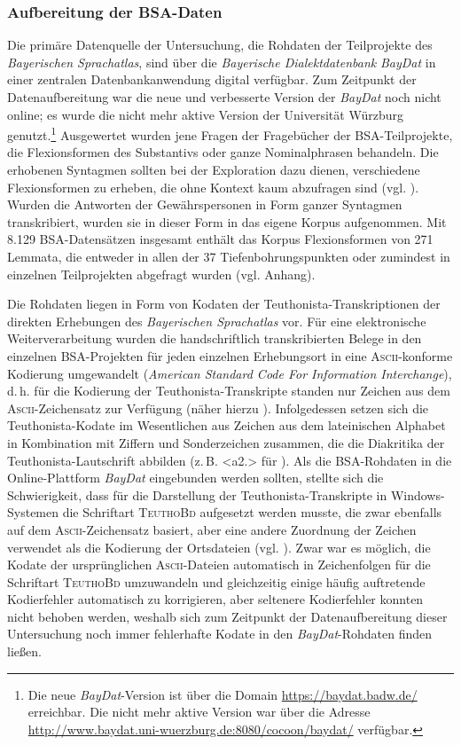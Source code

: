 \subsubsection{Aufbereitung der BSA-Daten}
\label{sec:6.3.1.1}
Die primäre Datenquelle der Untersuchung, die Rohdaten der Teilprojekte des \textit{Bayerischen Sprachatlas}, sind über die \textit{Bayerische Dialektdatenbank} \textit{BayDat} in einer zentralen Datenbankanwendung digital verfügbar. Zum Zeitpunkt der Datenaufbereitung war die neue und verbesserte Version der \textit{BayDat} noch nicht online; es wurde die nicht mehr aktive Version der Universität Würzburg genutzt.\footnote{Die neue \textit{BayDat}{}-Version ist über die Domain \url{https://baydat.badw.de/} erreichbar. Die nicht mehr aktive Version war über die Adresse \url{http://www.baydat.uni-wuerzburg.de:8080/cocoon/baydat/} verfügbar.} Ausgewertet wurden jene Fragen der Fragebücher der BSA-Teilprojekte, die Flexionsformen des Substantivs oder ganze Nominalphrasen behandeln. Die erhobenen Syntagmen sollten bei der Exploration dazu dienen, verschiedene Flexionsformen zu erheben, die ohne Kontext kaum abzufragen sind (vgl. \citealt[23]{Klepsch2013}). Wurden die Antworten der Gewährspersonen in Form ganzer Syntagmen transkribiert, wurden sie in dieser Form in das eigene Korpus aufgenommen. Mit 8.129 BSA-Datensätzen insgesamt enthält das Korpus Flexionsformen von 271 Lemmata, die entweder in allen der 37 Tiefenbohrungspunkten oder zumindest in einzelnen Teilprojekten abgefragt wurden (vgl. Anhang).

Die Rohdaten liegen in Form von Kodaten der Teuthonista-Transkriptionen der direkten Erhebungen des \textit{Bayerischen Sprachatlas} vor. Für eine elektronische Weiterverarbeitung wurden die handschriftlich transkribierten Belege in den einzelnen BSA-Projekten für jeden einzelnen Erhebungsort in eine \textsc{Ascii}{}-konforme Kodierung umgewandelt (\textit{American Standard Code For Information Interchange}), d.\,h. für die Kodierung der Teuthonista-Transkripte standen nur Zeichen aus dem \textsc{Ascii}{}-Zeichensatz zur Verfügung (näher hierzu \citealt[7--16]{Zimmermann2006}). Infolgedessen setzen sich die Teuthonista-Kodate im Wesentlichen aus Zeichen aus dem lateinischen Alphabet in Kombination mit Ziffern und Sonderzeichen zusammen, die die Diakritika der Teuthonista-Lautschrift abbilden (z.\,B. <a2.> für ). Als die BSA-Rohdaten in die Online-Plattform \textit{BayDat} eingebunden werden sollten, stellte sich die Schwierigkeit, dass für die Darstellung der Teuthonista-Transkripte in Windows-Systemen die Schriftart \textsc{TeuthoBd} aufgesetzt werden musste, die zwar ebenfalls auf dem \textsc{Ascii}{}-Zeichensatz basiert, aber eine andere Zuordnung der Zeichen verwendet als die Kodierung der Ortsdateien (vgl. \citealt[121]{Zimmermann2006}). Zwar war es möglich, die Kodate der ursprünglichen \textsc{Ascii}{}-Dateien automatisch in Zeichenfolgen für die Schriftart \textsc{TeuthoBd} umzuwandeln und gleichzeitig einige häufig auftretende Kodierfehler automatisch zu korrigieren, aber seltenere Kodierfehler konnten nicht behoben werden, weshalb sich zum Zeitpunkt der Datenaufbereitung dieser Untersuchung noch immer fehlerhafte Kodate in den \textit{BayDat}{}-Rohdaten finden ließen. 

